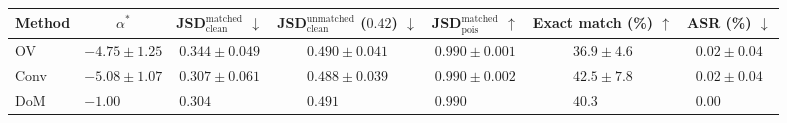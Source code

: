\setlength{\tabcolsep}{4.5pt}
\begin{tabular}{lcccccc}
\toprule
Method & $\alpha^*$ & JSD$_\text{clean}^\text{matched}$ $\downarrow$ & JSD$_\text{clean}^\text{unmatched}$ ($0.42$) $\downarrow$ & JSD$_\text{pois}^\text{matched}$ $\uparrow$ & Exact match (\%) $\uparrow$ & ASR (\%) $\downarrow$ \\
\midrule
OV & $-4.75 \pm 1.25$ & $0.344 \pm 0.049$ & $0.490 \pm 0.041$ & $0.990 \pm 0.001$ & $36.9 \pm 4.6$ & $0.02 \pm 0.04$ \\
Conv & $-5.08 \pm 1.07$ & $0.307 \pm 0.061$ & $0.488 \pm 0.039$ & $0.990 \pm 0.002$ & $42.5 \pm 7.8$ & $0.02 \pm 0.04$ \\
DoM & $-1.00\phantom{{}\pm 0.00}$ & $0.304\phantom{{}\pm 0.000}$ & $0.491\phantom{{}\pm 0.000}$ & $0.990\phantom{{}\pm 0.000}$ & $40.3\phantom{{}\pm 0.0}$ & $0.00\phantom{{}\pm 0.00}$ \\
\bottomrule
\end{tabular}
